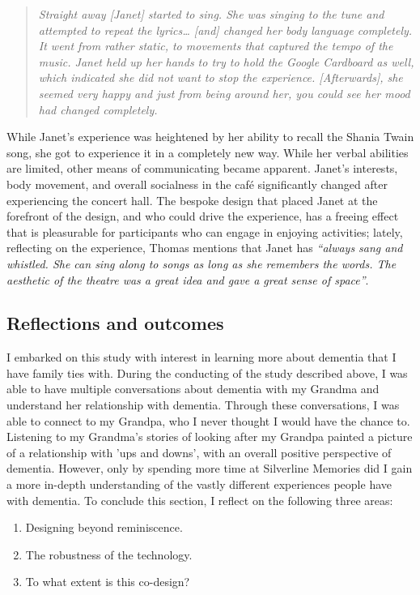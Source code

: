 \begin{quote}
\textit{Straight away [Janet] started to sing. She was singing to the tune and attempted to repeat the lyrics… [and] changed her body language completely. It went from rather static, to movements that captured the tempo of the music. Janet held up her hands to try to hold the Google Cardboard as well, which indicated she did not want to stop the experience. [Afterwards], she seemed very happy and just from being around her, you could see her mood had changed completely.}    
\end{quote}

While Janet’s experience was heightened by her ability to recall the Shania Twain song, she got to experience it in a completely new way. While her verbal abilities are limited, other means of communicating became apparent. Janet’s interests, body movement, and overall socialness in the café significantly changed after experiencing the concert hall. The bespoke design that placed Janet at the forefront of the design, and who could drive the experience, has a freeing effect that is pleasurable for participants who can engage in enjoying activities; lately, reflecting on the experience, Thomas mentions that Janet has \textit{``always sang and whistled. She can sing along to songs as long as she remembers the words. The aesthetic of the theatre was a great idea and gave a great sense of space''}.

\subsection{Reflections and outcomes}
\label{S1:ReflectionsOutcomes}
I embarked on this study with interest in learning more about dementia that I have family ties with. During the conducting of the study described above, I was able to have multiple conversations about dementia with my Grandma and understand her relationship with dementia. Through these conversations, I was able to connect to my Grandpa, who I never thought I would have the chance to. Listening to my Grandma's stories of looking after my Grandpa painted a picture of a relationship with 'ups and downs', with an overall positive perspective of dementia. However, only by spending more time at Silverline Memories did I gain a more in-depth understanding of the vastly different experiences people have with dementia. To conclude this section, I reflect on the following three areas:
\begin{enumerate}
    \item Designing beyond reminiscence.
    \item The robustness of the technology.
    \item To what extent is this co-design?
\end{enumerate}

